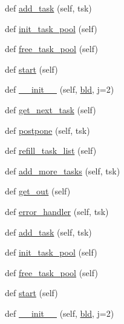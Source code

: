 \begin{DoxyCompactItemize}
\item 
def \hyperlink{classwaflib_1_1_runner_1_1_parallel_a7b6dec41418a4eb5a39aa35756ef39c6}{add\+\_\+task} (self, tsk)
\item 
def \hyperlink{classwaflib_1_1_runner_1_1_parallel_a847fede29cb9dfe31b6b694e1044d100}{init\+\_\+task\+\_\+pool} (self)
\item 
def \hyperlink{classwaflib_1_1_runner_1_1_parallel_aed9785fdb3b1d54bbdc5520942ebe237}{free\+\_\+task\+\_\+pool} (self)
\item 
def \hyperlink{classwaflib_1_1_runner_1_1_parallel_a091adebadfabd759640c7347de4b05e2}{start} (self)
\item 
def \hyperlink{classwaflib_1_1_runner_1_1_parallel_a0c0a52852b556178d86233e354383f51}{\+\_\+\+\_\+init\+\_\+\+\_\+} (self, \hyperlink{classwaflib_1_1_runner_1_1_parallel_a710f2069db915f1b04538ed7989511ff}{bld}, j=2)
\item 
def \hyperlink{classwaflib_1_1_runner_1_1_parallel_a13620afd7fb0dac47215c1a434c3a79a}{get\+\_\+next\+\_\+task} (self)
\item 
def \hyperlink{classwaflib_1_1_runner_1_1_parallel_ab025fd073c2f52e72df1a3bc8d188d0e}{postpone} (self, tsk)
\item 
def \hyperlink{classwaflib_1_1_runner_1_1_parallel_a2f7785b4be91f45b53a9f294fb3a990e}{refill\+\_\+task\+\_\+list} (self)
\item 
def \hyperlink{classwaflib_1_1_runner_1_1_parallel_a7501769205be6d24343c054f46e43289}{add\+\_\+more\+\_\+tasks} (self, tsk)
\item 
def \hyperlink{classwaflib_1_1_runner_1_1_parallel_aa5803cc70ce58b6f1ed09d8e4414aeef}{get\+\_\+out} (self)
\item 
def \hyperlink{classwaflib_1_1_runner_1_1_parallel_a5687053d52ada326ac8754dc15bd5138}{error\+\_\+handler} (self, tsk)
\item 
def \hyperlink{classwaflib_1_1_runner_1_1_parallel_a7b6dec41418a4eb5a39aa35756ef39c6}{add\+\_\+task} (self, tsk)
\item 
def \hyperlink{classwaflib_1_1_runner_1_1_parallel_a847fede29cb9dfe31b6b694e1044d100}{init\+\_\+task\+\_\+pool} (self)
\item 
def \hyperlink{classwaflib_1_1_runner_1_1_parallel_aed9785fdb3b1d54bbdc5520942ebe237}{free\+\_\+task\+\_\+pool} (self)
\item 
def \hyperlink{classwaflib_1_1_runner_1_1_parallel_a091adebadfabd759640c7347de4b05e2}{start} (self)
\item 
def \hyperlink{classwaflib_1_1_runner_1_1_parallel_a0c0a52852b556178d86233e354383f51}{\+\_\+\+\_\+init\+\_\+\+\_\+} (self, \hyperlink{classwaflib_1_1_runner_1_1_parallel_a710f2069db915f1b04538ed7989511ff}{bld}, j=2)

\end{DoxyCompactItemize}

